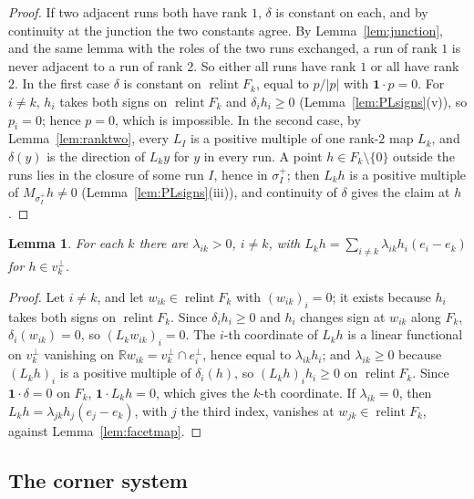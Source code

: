 \documentclass[11pt]{article}
\newcommand{\R}{\mathbb{R}}
\newcommand{\one}{\mathbf{1}}
\DeclareMathOperator{\relint}{relint}
\theoremstyle{plain}
\newtheorem{lemma}[theorem]{Lemma}
\theoremstyle{definition}
\theoremstyle{remark}
\begin{document}
\begin{proof}
If two adjacent runs both have rank $1$, $\delta$ is constant on each, and by continuity
at the junction the two constants agree. By Lemma~\ref{lem:junction}, and the same lemma
with the roles of the two runs exchanged, a run of rank $1$ is never adjacent to a run of
rank $2$. So either all runs have rank $1$ or all have rank $2$. In the first case $\delta$
is constant on $\relint F_k$, equal to $p/|p|$ with $\one\cdot p=0$. For $i\ne k$, $h_i$
takes both signs on $\relint F_k$ and $\delta_ih_i\ge0$ (Lemma~\ref{lem:PLsigns}(v)), so
$p_i=0$; hence $p=0$, which is impossible. In the second case, by
Lemma~\ref{lem:ranktwo}, every $L_I$ is a positive multiple of one rank-$2$ map $L_k$, and
$\delta(y)$ is the direction of $L_ky$ for $y$ in every run. A point $h\in F_k\setminus
\{0\}$ outside the runs lies in the closure of some run $I$, hence in $\sigma^+_I$; then
$L_kh$ is a positive multiple of $M_{\sigma^+_I}h\ne0$ (Lemma~\ref{lem:PLsigns}(iii)), and
continuity of $\delta$ gives the claim at $h$.
\end{proof}

\begin{lemma}\label{lem:crossrows}
For each $k$ there are $\lambda_{ik}>0$, $i\ne k$, with $L_kh=\sum_{i\ne k}\lambda_{ik}h_i
(e_i-e_k)$ for $h\in v_k^\perp$.
\end{lemma}

\begin{proof}
Let $i\ne k$, and let $w_{ik}\in\relint F_k$ with $(w_{ik})_i=0$; it exists because $h_i$
takes both signs on $\relint F_k$. Since $\delta_ih_i\ge0$ and $h_i$ changes sign at
$w_{ik}$ along $F_k$, $\delta_i(w_{ik})=0$, so $(L_kw_{ik})_i=0$. The $i$-th coordinate of
$L_kh$ is a linear functional on $v_k^\perp$ vanishing on $\R w_{ik}=v_k^\perp\cap e_i^\perp$,
hence equal to $\lambda_{ik}h_i$; and $\lambda_{ik}\ge0$ because $(L_kh)_i$ is a positive
multiple of $\delta_i(h)$, so $(L_kh)_ih_i\ge0$ on $\relint F_k$. Since $\one\cdot\delta=0$ on $F_k$, $\one\cdot L_kh=0$, which gives the $k$-th
coordinate. If $\lambda_{ik}=0$, then $L_k h=\lambda_{jk}h_j(e_j-e_k)$, with $j$ the third
index, vanishes at $w_{jk}\in\relint F_k$, against Lemma~\ref{lem:facetmap}.
\end{proof}

\subsection*{The corner system}\label{app:corner}
\end{document}
